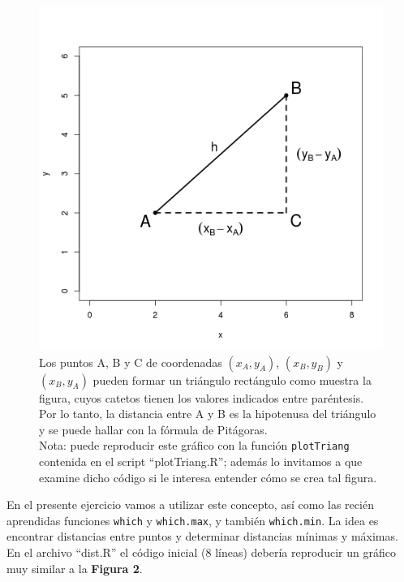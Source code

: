 \documentclass[]{article}
\makeatletter
\def\maxwidth{\ifdim\Gin@nat@width>\linewidth\linewidth
\else\Gin@nat@width\fi}
\let\Oldincludegraphics\includegraphics
\renewcommand{\includegraphics}[1]{\Oldincludegraphics[width=\maxwidth]{#1}}
\makeatother
\begin{document}
\begin{figure}[htbp]
\centering
\includegraphics{figure/unnamed-chunk-9.png}
\caption{Los puntos A, B y C de coordenadas $(x_A, y_A)$,
$(x_B, y_B)$ y $(x_B, y_A)$ pueden formar un triángulo rectángulo como
muestra la figura, cuyos catetos tienen los valores indicados entre
paréntesis. Por lo tanto, la distancia entre A y B es la hipotenusa del
triángulo y se puede hallar con la fórmula de Pitágoras.\\Nota: puede
reproducir este gráfico con la función \texttt{plotTriang} contenida en
el script ``plotTriang.R''; además lo invitamos a que examine dicho
código si le interesa entender cómo se crea tal figura.}
\end{figure}


En el presente ejercicio vamos a utilizar este concepto, así como las
recién aprendidas funciones \texttt{which} y \texttt{which.max}, y
también \texttt{which.min}. La idea es encontrar distancias entre puntos
y determinar distancias mínimas y máximas. En el archivo ``dist.R'' el
código inicial (8 líneas) debería reproducir un gráfico muy similar a la
\textbf{Figura 2}.
\end{document}
